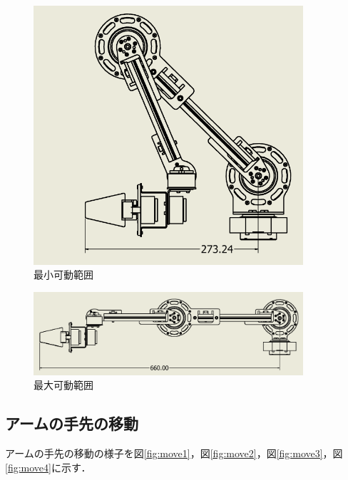 \begin{figure}[htbp]
  \centering
  \includegraphics[width=10cm]{images/design/arm_short.png}
  \caption{最小可動範囲}
  \label{fig:arm_short}
\end{figure}

\begin{figure}[htbp]
  \centering
  \includegraphics[width=10cm]{images/design/arm_long.png}
  \caption{最大可動範囲}
  \label{fig:arm_long}
\end{figure}

\subsection{アームの手先の移動}
アームの手先の移動の様子を図\ref{fig:move1}，図\ref{fig:move2}，図\ref{fig:move3}，図\ref{fig:move4}に示す．

